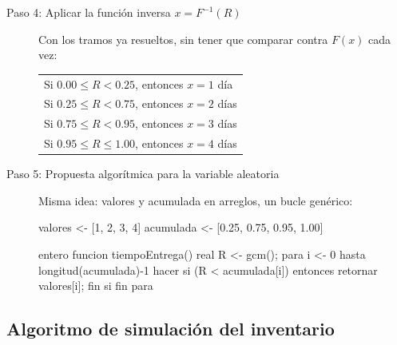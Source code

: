 \documentclass[12pt]{article}
\begin{document}
\begin{description}
    \item[Paso 4: Aplicar la función inversa $x=F^{-1}(R)$]

    Con los tramos ya resueltos, sin tener que comparar contra $F(x)$ cada vez:

    \begin{center}
    \begin{tabular}{l}
    Si $0.00 \leq R < 0.25$, entonces $x=1$ día \\
    Si $0.25 \leq R < 0.75$, entonces $x=2$ días \\
    Si $0.75 \leq R < 0.95$, entonces $x=3$ días \\
    Si $0.95 \leq R \leq 1.00$, entonces $x=4$ días \\
    \end{tabular}
    \end{center}

    \item[Paso 5: Propuesta algorítmica para la variable aleatoria]

    Misma idea: valores y acumulada en arreglos, un bucle genérico:

    \begin{Algoritmo}{}
valores   <- [1, 2, 3, 4]
acumulada <- [0.25, 0.75, 0.95, 1.00]

entero funcion tiempoEntrega(){
    real R <- gcm();
    para i <- 0 hasta longitud(acumulada)-1 hacer
        si (R < acumulada[i]) entonces
            retornar valores[i];
        fin si
    fin para
}
    \end{Algoritmo}
\end{description}

\subsection{Algoritmo de simulación del inventario}
\end{document}

